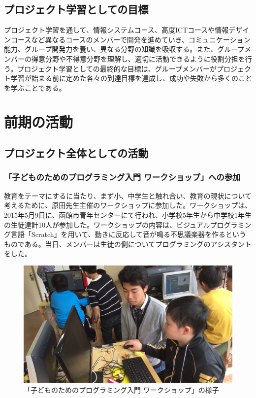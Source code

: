 \documentclass[openany,11pt,papersize]{jsbook}
\begin{document}
\section{プロジェクト学習としての目標}
プロジェクト学習を通して、情報システムコース、高度ICTコースや情報デザインコースなど異なるコースのメンバーで開発を進めていき、コミュニケーション能力、グループ開発力を養い、異なる分野の知識を吸収する。また、グループメンバーの得意分野や不得意分野を理解し、適切に活動できるように役割分担を行う。プロジェクト学習としての最終的な目標は、グループメンバーがプロジェクト学習が始まる前に定めた各々の到達目標を達成し、成功や失敗から多くのことを学ぶことである。

\chapter{前期の活動}

\section{プロジェクト全体としての活動}

\subsection{「子どものためのプログラミング入門 ワークショップ」への参加}
\par 教育をテーマにするに当たり、まず小、中学生と触れ合い、教育の現状について考えるために、原田先生主催のワークショップに参加した。ワークショップは、2015年5月9日に、函館市青年センターにて行われ、小学校5年生から中学校1年生の生徒達計10人が参加した。ワークショップの内容は、ビジュアルプログラミング言語「Scratch」を用いて、動きに反応して音が鳴る不思議楽器を作るというものである。当日、メンバーは生徒の側についてプログラミングのアシスタントをした。

\begin{figure}[H]
\begin{center}
\includegraphics[width=14cm, bb=0 0 1920 1080]{img/20150509_workshop.jpg}
\end{center}
\caption{「子どものためのプログラミング入門 ワークショップ」の様子}
\end{figure}
\end{document}
